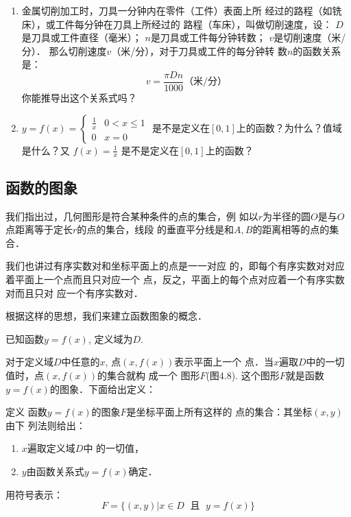 \begin{enumerate}
\item 金属切削加工时，刀具一分钟内在零件（工件）表面上所
经过的路程（如铣床），或工件每分钟在刀具上所经过的
路程（车床），叫做切削速度，设：
$D$是刀具或工件直径（毫米）；
$n$是刀具或工件每分钟转数；
$v$是切削速度（米/分）．
那么切削速度$v$（米/分），对于刀具或工件的每分钟转
数$n$的函数关系是：
\[v=\frac{\pi Dn}{1000}\text{（米/分）}\]
你能推导出这个关系式吗？
\item $y=f(x)=\begin{cases}
    \frac{1}{x} & 0<x\le 1\\ 0& x=0
\end{cases}$
是不是定义在$[0,1]$上的函数？为什么？值域是什么？又
$f(x)=\frac{1}{x}$
是不是定义在$[0,1]$上的函数？
\end{enumerate}

\subsection{函数的图象}
我们指出过，几何图形是符合某种条件的点的集合，例
如以$r$为半径的圆$O$是与$O$点距离等于定长$r$的点的集合，线段
的垂直平分线是和$A,B$的距离相等的点的集合．

我们也讲过有序实数对和坐标平面上的点是一一对应
的，即每个有序实数对对应着平面上一个点而且只对应一个
点，反之，平面上的每个点对应着一个有序实数对而且只对
应一个有序实数对．

根据这样的思想，我们来建立函数图象的概念．

已知函数$y=f(x)$, 定义域为$D$.
\begin{figure}[htp]
    \centering
{}
    \caption{}
\end{figure}


对于定义域$D$中任意的$x$, 点$(x,f(x))$表示平面上一个
点．当$x$遍取$D$中的一切值时，点$(x,f(x))$的集合就构 成一个
图形$F$(图4.8). 这个图形$F$就是函数$y=f(x)$的图象．下面给出定义：

\begin{blk}{定义}
函数$y=f(x)$的图象$F$是坐标平面上所有这样的
点的集合：其坐标$(x,y)$由下
列法则给出：
\begin{enumerate}
    \item $x$遍取定义域$D$中
的一切值，
\item $y$由函数关系式$y=f(x)$确定．
\end{enumerate}
用符号表示：
\[F=\{(x,y)|x\in D\; \text{ 且 }\; y=f(x)\}\]    
\end{blk}


